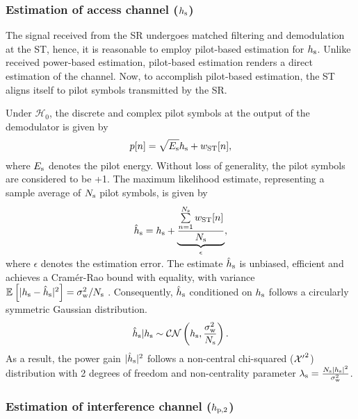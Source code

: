 \subsubsection{Estimation of access channel ($h_{\text{s}}$)}
The signal received from the SR undergoes matched filtering and demodulation at the ST, hence, it is reasonable to employ pilot-based estimation for $h_{\text{s}}$. Unlike received power-based estimation, pilot-based estimation renders a direct estimation of the channel. Now, to accomplish pilot-based estimation, the ST aligns itself to pilot symbols transmitted by the SR. 

Under $\mathcal H_0$, the discrete and complex pilot symbols at the output of the demodulator is given by \cite{Gifford08} 
\begin{align}
p[n] = \sqrt{E_{\text{s}}} h_{\text{s}} + w_{\text{ST}}[n], 
\label{eq_IS:pilot_sig}
\end{align}
where $E_{\text{s}}$ denotes the pilot energy. Without loss of generality, the pilot symbols are considered to be +1. The maximum likelihood estimate, representing a sample average of $N_{\text{s}}$ pilot symbols, is given by \cite{Gifford05}
\begin{align}
\hat{h}_{\text{s}} = h_{\text{s}} + \smash[b]{\underbrace{\frac{\sum\limits^{N_{\text{s}}}_{n=1} w_{\text{ST}}[n]}{N_{\text{s}}}}_{\epsilon}},
\label{eq_IS:pilot_MLE}
\end{align}\\[-0.00em]
where $\epsilon$ denotes the estimation error. 
The estimate $\hat{h}_{\text{s}}$ is unbiased, efficient and achieves a Cram\'er-Rao bound with equality, with variance ${\mathbb E}_{}\left[ |h_{\text{s}} -\hat{h}_{\text{s}}|^2 \right] = \sigma^2_{\text{w}}/N_{\text{s}}$ \cite{Gifford08}. Consequently, $\hat{h}_{\text{s}}$ conditioned on $h_{\text{s}}$ follows a circularly symmetric Gaussian distribution.
\begin{align}
\hat{h}_{\text{s}}|h_{\text{s}} \sim \mathcal{CN}\left( h_{\text{s}},\frac{\sigma^2_{\text{w}}}{N_{\text{s}}} \right).
\label{eq_IS:ehs} 
\end{align}
As a result, the power gain $|\hat{h}_{\text{s}}|^2$ follows a non-central chi-squared ($\ncchi2$) distribution with 2 degrees of freedom and non-centrality parameter $\lambda_{\text{s}} = \frac{N_{\text{s}} |h_{\text{s}}|^2}{\sigma^2_{\text{w}}}$.  

\subsubsection{Estimation of interference channel ($h_{\text{p,2}}$)}


